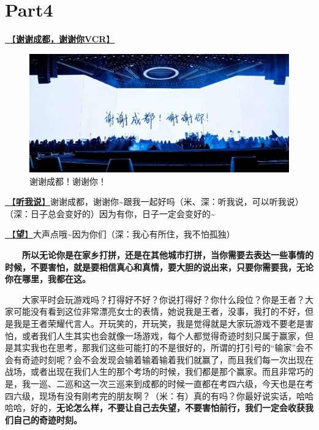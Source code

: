 \documentclass[]{ctexbook}
\begin{document}
\section{Part4}\label{chengdu-20240615-part4}

\hyperref[thank-you-vcr]{🎥【\textbf{谢谢成都，谢谢你VCR}】}

\begin{figure}

{\centering \includegraphics[width=400pt]{img/chengdu20240615/thank-chengdu} 

}

\caption{谢谢成都！谢谢你！}\label{fig:unnamed-chunk-52}
\end{figure}

\hyperref[listen-to-me]{🎵【\textbf{听我说}】}谢谢成都，谢谢你\textasciitilde 跟我一起好吗（米、深：听我说，可以听我说）（深：日子总会变好的）因为有你，日子一定会变好的\textasciitilde{}

\hyperref[hope]{🎵【\textbf{望}】}大声点哦\textasciitilde 因为你们（深：我心有所住，我不怕孤独）

  \textbf{所以无论你是在家乡打拼，还是在其他城市打拼，当你需要去表达一些事情的时候，不要害怕，就是要相信真心和真情，要大胆的说出来，只要你需要我，无论你在哪里，我都在这。}

  大家平时会玩游戏吗？打得好不好？你说打得好？你什么段位？你是王者？大家可能没有看到这位非常漂亮女士的表情，她说我是王者，没事，我打的不好，但是我是王者荣耀代言人。开玩笑的，开玩笑，我是觉得就是大家玩游戏不要老是害怕，或者我们人生其实也会就像一场游戏，每个人都觉得奇迹时刻只属于赢家，但是其实我也在思考，那我们这些可能打的不是很好的，所谓的打引号的``输家''会不会有奇迹时刻呢？会不会发现会输着输着输着我们就赢了，而且我们每一次出现在战场，或者出现在我们人生的那个考场的时候，我们都是那个赢家。而且非常巧的是，我一巡、二巡和这一次三巡来到成都的时候一直都在考四六级，今天也是在考四六级，现场有没有刚考完的朋友啊？（米：有）真的有吗？你最好说实话，哈哈哈哈，好的，\textbf{无论怎么样，不要让自己去失望，不要害怕前行，我们一定会收获我们自己的奇迹时刻。}
\end{document}
